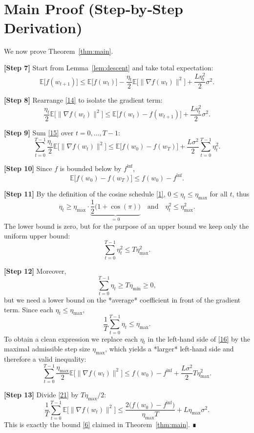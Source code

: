 \documentclass{article}
\newcommand{\EE}{\mathbb{E}}
\begin{document}
\section*{Main Proof (Step‑by‑Step Derivation)}
We now prove Theorem~\ref{thm:main}.

\textbf{[Step 7]} Start from Lemma~\ref{lem:descent} and take total expectation:
\[
\EE\!\bigl[f(w_{t+1})\bigr]
\le \EE\!\bigl[f(w_{t})\bigr]
-\frac{\eta_{t}}{2}\EE\!\bigl[\|\nabla f(w_{t})\|^{2}\bigr]
+\frac{L\eta_{t}^{2}}{2}\sigma^{2}.
\tag{14}
\]

\textbf{[Step 8]} Rearrange \eqref{14} to isolate the gradient term:
\[
\frac{\eta_{t}}{2}\EE\!\bigl[\|\nabla f(w_{t})\|^{2}\bigr]
\le \EE\!\bigl[f(w_{t})-f(w_{t+1})\bigr]
+\frac{L\eta_{t}^{2}}{2}\sigma^{2}.
\tag{15}
\]

\textbf{[Step 9]} Sum \eqref{15} over $t=0,\dots,T-1$:
\[
\sum_{t=0}^{T-1}\frac{\eta_{t}}{2}\EE\!\bigl[\|\nabla f(w_{t})\|^{2}\bigr]
\le \EE\!\bigl[f(w_{0})-f(w_{T})\bigr]
+\frac{L\sigma^{2}}{2}\sum_{t=0}^{T-1}\eta_{t}^{2}.
\tag{16}
\]

\textbf{[Step 10]} Since $f$ is bounded below by $f^{\inf}$,
\[
\EE\!\bigl[f(w_{0})-f(w_{T})\bigr]\le f(w_{0})-f^{\inf}.
\tag{17}
\]

\textbf{[Step 11]} By the definition of the cosine schedule \eqref{1},
$0\le\eta_{t}\le\eta_{\max}$ for all $t$, thus
\[
\eta_{t}\ge\eta_{\max}\cdot\underbrace{\frac12\bigl(1+\cos(\pi)\bigr)}_{=0}
\quad\text{and}\quad
\eta_{t}^{2}\le\eta_{\max}^{2}.
\tag{18}
\]
The lower bound is zero, but for the purpose of an upper bound we keep only the uniform upper bound:
\[
\sum_{t=0}^{T-1}\eta_{t}^{2}\le T\eta_{\max}^{2}.
\tag{19}
\]

\textbf{[Step 12]} Moreover,
\[
\sum_{t=0}^{T-1}\eta_{t}\ge T\eta_{\min}\ge 0,
\]
but we need a lower bound on the *average* coefficient in front of the gradient term. Since each $\eta_{t}\le\eta_{\max}$,
\[
\frac{1}{T}\sum_{t=0}^{T-1}\eta_{t}\le\eta_{\max}.
\tag{20}
\]
To obtain a clean expression we replace each $\eta_{t}$ in the left‑hand side of \eqref{16} by the maximal admissible step size $\eta_{\max}$, which yields a *larger* left‑hand side and therefore a valid inequality:
\[
\sum_{t=0}^{T-1}\frac{\eta_{\max}}{2}\EE\!\bigl[\|\nabla f(w_{t})\|^{2}\bigr]
\le f(w_{0})-f^{\inf}
+\frac{L\sigma^{2}}{2}T\eta_{\max}^{2}.
\tag{21}
\]

\textbf{[Step 13]} Divide \eqref{21} by $T\eta_{\max}/2$:
\[
\frac{1}{T}\sum_{t=0}^{T-1}\EE\!\bigl[\|\nabla f(w_{t})\|^{2}\bigr]
\le \frac{2\bigl(f(w_{0})-f^{\inf}\bigr)}{\eta_{\max}T}
+L\eta_{\max}\sigma^{2}.
\tag{22}
\]
This is exactly the bound \eqref{6} claimed in Theorem~\ref{thm:main}. ∎
\end{document}
